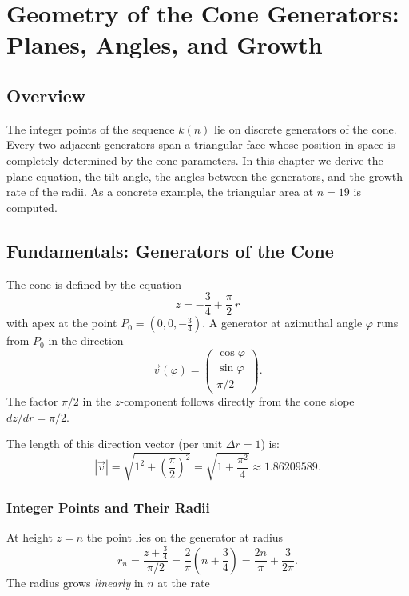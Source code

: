 \chapter{Geometry of the Cone Generators: Planes, Angles, and Growth}
\label{sec:kegelstrahlen}

\section{Overview}

The integer points of the sequence $k(n)$ lie on discrete
generators of the cone. Every two adjacent generators span a
triangular face whose position in space is completely determined
by the cone parameters. In this chapter we derive the plane equation,
the tilt angle, the angles between the generators, and the
growth rate of the radii. As a concrete example, the triangular
area at $n = 19$ is computed.

\section{Fundamentals: Generators of the Cone}

The cone is defined by the equation
\[
  z = -\frac{3}{4} + \frac{\pi}{2}\,r
\]
with apex at the point $P_0 = (0, 0, -\tfrac{3}{4})$.
A generator at azimuthal angle $\varphi$ runs from $P_0$ in the direction
\[
  \vec{v}(\varphi)
  = \begin{pmatrix}\cos\varphi\\ \sin\varphi\\ \pi/2\end{pmatrix}.
\]
The factor $\pi/2$ in the $z$-component follows directly from the
cone slope $dz/dr = \pi/2$.

The length of this direction vector (per unit $\Delta r = 1$) is:
\[
  |\vec{v}| = \sqrt{1^2 + \left(\frac{\pi}{2}\right)^2}
            = \sqrt{1 + \frac{\pi^2}{4}}
            \approx 1.86209589.
\]

\subsection*{Integer Points and Their Radii}

At height $z = n$ the point lies on the generator at radius
\[
  r_n = \frac{z + \tfrac{3}{4}}{\pi/2}
      = \frac{2}{\pi}\!\left(n + \frac{3}{4}\right)
      = \frac{2n}{\pi} + \frac{3}{2\pi}.
\]
The radius grows \emph{linearly} in $n$ at the rate

